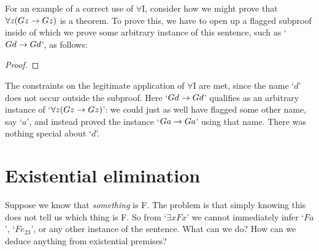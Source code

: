 For an example of a correct use of $\forall$I, consider how we might prove that $\forall z(Gz \rightarrow Gz)$ is a theorem.  To prove this, we have to open up a flagged subproof inside of which we prove some arbitrary instance of this sentence, such as `$Gd \rightarrow Gd$', as follows:

\begin{proof}
	\open
	 \fl{}
	\open
	\close
	\close
\end{proof}
The constraints on the legitimate application of $\forall$I are met, since the name `$d$' does not occur outside the subproof.  Here `$Gd \rightarrow Gd$' qualifies as an arbitrary instance of `$\forall z(Gz \rightarrow Gz)$': we could just as well have flagged some other name, say `$a$', and instead proved the instance `$Ga \rightarrow Ga$' using that name. There was nothing special about `$d$'.



\section{Existential elimination}
Suppose we know that \emph{something} is F. The problem is that simply knowing this does not tell us which thing is F. So from `$\exists x Fx$' we cannot immediately infer `$Fa$', `$Fe_{23}$', or any other instance of the sentence. What can we do?  How can we deduce anything from existential premises?

